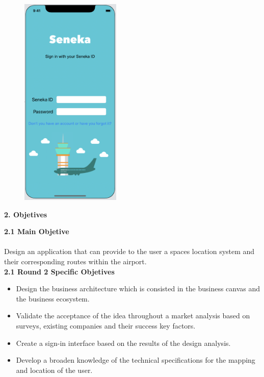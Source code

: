 \documentclass[]{article}
\begin{document}
\begin{figure}[H]
\centering
\includegraphics[height=4.0in]{Figura_1.jpg}
\end{figure}

\Large{
\textbf{2. Objetives}\\
}

\Large{
\textbf{2.1 Main Objetive}\\
}\\
[0.1cm]
Design an application that can provide to the user a spaces location system and their corresponding routes within the airport.\\

\Large{
\textbf{2.1 Round 2 Specific Objetives}\\
}
\begin{itemize}
	\item Design the business architecture which is consisted in the business canvas and the business ecosystem.
	\item Validate the acceptance of the idea throughout a market analysis based on surveys, existing companies and 		their success key factors.
	\item Create a sign-in interface based on the results of the design analysis. 
	\item Develop a broaden knowledge of the technical specifications for the mapping and location of the user. 
	
\end{itemize}
\end{document}
